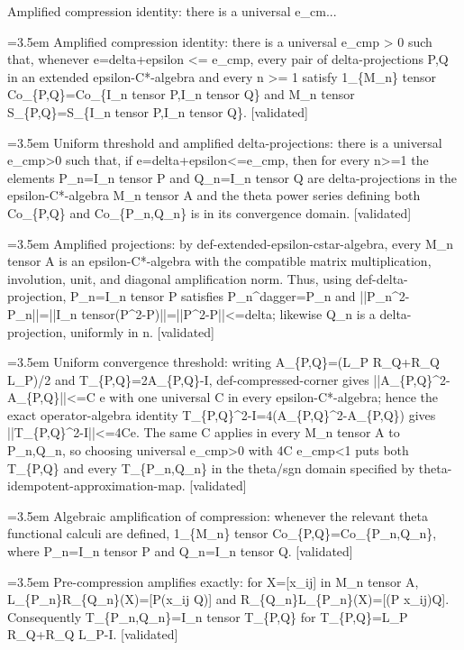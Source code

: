 \documentclass{article}
\newcommand{\step}[1]{\par\noindent\hangindent=3.5em\hangafter=1%
  \makebox[3.5em][l]{\textbf{#1.}}}
\newcommand{\steptag}[1]{\hfill{\small\textsf{[#1]}}}
\begin{document}
\begin{proofbox}{Amplified compression identity: there is a universal e\_cm...}
\step{1} Amplified compression identity: there is a universal e\_cmp > 0 such that, whenever e=delta+epsilon <= e\_cmp, every pair of delta-projections P,Q in an extended epsilon-C*-algebra and every n >= 1 satisfy 1\_\{M\_n\} tensor Co\_\{P,Q\}=Co\_\{I\_n tensor P,I\_n tensor Q\} and M\_n tensor S\_\{P,Q\}=S\_\{I\_n tensor P,I\_n tensor Q\}. \steptag{validated} \\[6pt]
\step{1.1} Uniform threshold and amplified delta-projections: there is a universal e\_cmp>0 such that, if e=delta+epsilon<=e\_cmp, then for every n>=1 the elements P\_n=I\_n tensor P and Q\_n=I\_n tensor Q are delta-projections in the epsilon-C*-algebra M\_n tensor A and the theta power series defining both Co\_\{P,Q\} and Co\_\{P\_n,Q\_n\} is in its convergence domain. \steptag{validated} \\[6pt]
\step{1.1.1} Amplified projections: by def-extended-epsilon-cstar-algebra, every M\_n tensor A is an epsilon-C*-algebra with the compatible matrix multiplication, involution, unit, and diagonal amplification norm. Thus, using def-delta-projection, P\_n=I\_n tensor P satisfies P\_n\textasciicircum{}dagger=P\_n and ||P\_n\textasciicircum{}2-P\_n||=||I\_n tensor(P\textasciicircum{}2-P)||=||P\textasciicircum{}2-P||<=delta; likewise Q\_n is a delta-projection, uniformly in n. \steptag{validated} \\[4pt]
\step{1.1.2} Uniform convergence threshold: writing A\_\{P,Q\}=(L\_P R\_Q+R\_Q L\_P)/2 and T\_\{P,Q\}=2A\_\{P,Q\}-I, def-compressed-corner gives ||A\_\{P,Q\}\textasciicircum{}2-A\_\{P,Q\}||<=C e with one universal C in every epsilon-C*-algebra; hence the exact operator-algebra identity T\_\{P,Q\}\textasciicircum{}2-I=4(A\_\{P,Q\}\textasciicircum{}2-A\_\{P,Q\}) gives ||T\_\{P,Q\}\textasciicircum{}2-I||<=4Ce. The same C applies in every M\_n tensor A to P\_n,Q\_n, so choosing universal e\_cmp>0 with 4C e\_cmp<1 puts both T\_\{P,Q\} and every T\_\{P\_n,Q\_n\} in the theta/sgn domain specified by theta-idempotent-approximation-map. \steptag{validated} \\[4pt]
\step{1.2} Algebraic amplification of compression: whenever the relevant theta functional calculi are defined, 1\_\{M\_n\} tensor Co\_\{P,Q\}=Co\_\{P\_n,Q\_n\}, where P\_n=I\_n tensor P and Q\_n=I\_n tensor Q. \steptag{validated} \\[6pt]
\step{1.2.1} Pre-compression amplifies exactly: for X=[x\_ij] in M\_n tensor A, L\_\{P\_n\}R\_\{Q\_n\}(X)=[P(x\_ij Q)] and R\_\{Q\_n\}L\_\{P\_n\}(X)=[(P x\_ij)Q]. Consequently T\_\{P\_n,Q\_n\}=I\_n tensor T\_\{P,Q\} for T\_\{P,Q\}=L\_P R\_Q+R\_Q L\_P-I. \steptag{validated} \\[4pt]

\end{proofbox}
\end{document}

